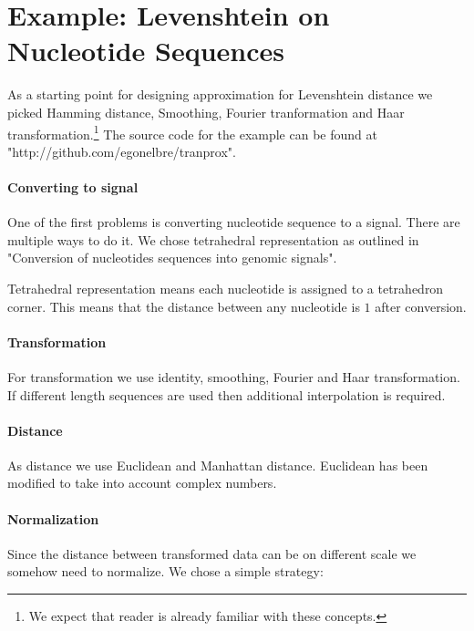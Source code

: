 \documentclass [12pt, a4]{article} %
\begin{document}
\section{Example: Levenshtein on Nucleotide Sequences}

As a starting point for designing approximation for Levenshtein distance
we picked Hamming distance\cite{wiki:Hamming}, Smoothing\cite{wiki:Smoothing}, Fourier tranformation\cite{wiki:Fourier} and Haar transformation\cite{wiki:Haar}.\footnote{We expect that reader is already familiar with these concepts.} The source code for the example can be found at "http://github.com/egonelbre/tranprox"\cite{Tranprox}.

\paragraph{Converting to signal}

One of the first problems is converting nucleotide sequence to a signal. There are multiple ways to do it. We chose tetrahedral representation as outlined in "Conversion of nucleotides sequences into genomic signals". \cite{cristea2002conversion}

Tetrahedral representation means each nucleotide is assigned to a tetrahedron corner. This means that the distance between any nucleotide is $1$ after conversion.

\paragraph{Transformation}

For transformation we use identity, smoothing, Fourier and Haar transformation.
If different length sequences are used then additional interpolation\cite{wiki:Interpolation} is required.


\paragraph{Distance}

As distance we use Euclidean and Manhattan distance. Euclidean has been modified to take into account complex numbers.

\paragraph{Normalization}

Since the distance between transformed data can be on different scale we somehow need to normalize. We chose a simple strategy:
\end{document}
